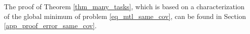 The proof of Theorem \ref{thm_many_tasks}, which is based on a characterization of the global minimum of problem \eqref{eq_mtl_same_cov}, can be found in Section  \ref{app_proof_error_same_cov}.

